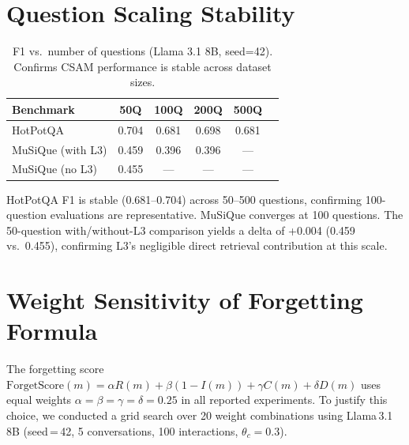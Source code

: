 \documentclass{article}
\begin{document}
\section{Question Scaling Stability}
\label{app:scaling_q}

\begin{table}[h]
\centering
\caption{F1 vs.\ number of questions (Llama 3.1 8B, seed=42).
  Confirms CSAM performance is stable across dataset sizes.}
\label{tab:scaling_q}
\begin{tabular}{lccccc}
\toprule
Benchmark & 50Q & 100Q & 200Q & 500Q \\
\midrule
HotPotQA & 0.704 & 0.681 & 0.698 & 0.681 \\
MuSiQue (with L3)    & 0.459 & 0.396 & 0.396 & --- \\
MuSiQue (no L3)      & 0.455 & ---   & ---   & --- \\
\bottomrule
\end{tabular}
\end{table}

HotPotQA F1 is stable (0.681–0.704) across 50–500 questions, confirming
100-question evaluations are representative.  MuSiQue converges at 100
questions.  The 50-question with/without-L3 comparison yields a delta of
+0.004 (0.459 vs.\ 0.455), confirming L3's negligible direct retrieval
contribution at this scale.

\section{Weight Sensitivity of Forgetting Formula}
\label{app:weight_sensitivity}

\begin{sloppypar}
The forgetting score $\text{ForgetScore}(m) = \alpha R(m) + \beta (1-I(m)) + \gamma C(m) + \delta D(m)$
uses equal weights $\alpha=\beta=\gamma=\delta=0.25$ in all reported experiments.
To justify this choice, we conducted a grid search over 20 weight combinations
using Llama\,3.1 8B (seed\,=\,42, 5 conversations, 100 interactions, $\theta_c=0.3$).
\end{sloppypar}
\end{document}
